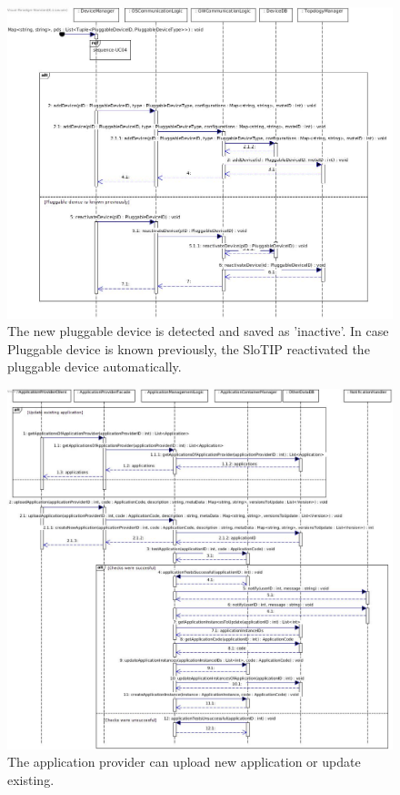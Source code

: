     \begin{figure}[!htp]
    	\centering
    	\includegraphics[width=\textwidth]{images/sequence-U2-UC4}
    	\caption[Plugging in a new pluggable device (sensor or actuator)]{ The new pluggable device is detected and saved as 'inactive'. In case Pluggable device is known previously, the SloTIP reactivated the pluggable device automatically.}\label{fig:seq_scenario6}
    \end{figure}

    \begin{figure}[h]
    	\centering
    	\includegraphics[width=\textwidth]{images/sequence-U1-UC22}
    	\caption[Upgrading an application]{ The application provider can upload new application or update existing.}\label{fig:seq_scenario8}
    \end{figure}

